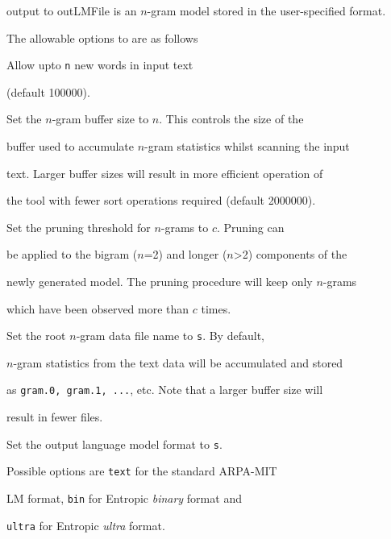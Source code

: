 output to outLMFile is an $n$-gram model stored in the user-specified format.





The allowable options to  are as follows


\begin{optlist}


   Allow upto \texttt{n} new words in input text


        (default 100000).





   Set the $n$-gram buffer size to $n$. This controls the size of the


	buffer used to accumulate $n$-gram statistics whilst scanning the input


	text.  Larger buffer sizes will result in more efficient operation of


	the tool with fewer sort operations required (default 2000000).





   Set the pruning threshold for $n$-grams to $c$.  Pruning can


	be applied to the bigram ($n$=2) and longer ($n$>2) components of the


	newly generated model. The pruning procedure will keep only $n$-grams


	which have been observed more than $c$ times.





   Set the root $n$-gram data file name to {\tt s}. By default,


  	$n$-gram statistics from the text data will be accumulated and stored


  	as {\tt gram.0, gram.1, ...}, etc. Note that a larger buffer size will


  	result in fewer files.


        


   Set the output language model format to {\tt s}.


        Possible options are {\tt text} for the standard ARPA-MIT


	LM format, {\tt bin} for Entropic {\em binary} format and 


        {\tt ultra} for Entropic {\em ultra} format.






\end{optlist}
